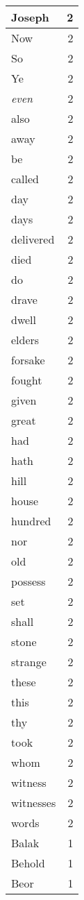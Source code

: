\begin{center}
\begin{longtable}{l|r}
Joseph & 2 \\ \hline
Now & 2 \\ \hline
So & 2 \\ \hline
Ye & 2 \\ \hline
\emph{even} & 2 \\ \hline
also & 2 \\ \hline
away & 2 \\ \hline
be & 2 \\ \hline
called & 2 \\ \hline
day & 2 \\ \hline
days & 2 \\ \hline
delivered & 2 \\ \hline
died & 2 \\ \hline
do & 2 \\ \hline
drave & 2 \\ \hline
dwell & 2 \\ \hline
elders & 2 \\ \hline
forsake & 2 \\ \hline
fought & 2 \\ \hline
given & 2 \\ \hline
great & 2 \\ \hline
had & 2 \\ \hline
hath & 2 \\ \hline
hill & 2 \\ \hline
house & 2 \\ \hline
hundred & 2 \\ \hline
nor & 2 \\ \hline
old & 2 \\ \hline
possess & 2 \\ \hline
set & 2 \\ \hline
shall & 2 \\ \hline
stone & 2 \\ \hline
strange & 2 \\ \hline
these & 2 \\ \hline
this & 2 \\ \hline
thy & 2 \\ \hline
took & 2 \\ \hline
whom & 2 \\ \hline
witness & 2 \\ \hline
witnesses & 2 \\ \hline
words & 2 \\ \hline
Balak & 1 \\ \hline
Behold & 1 \\ \hline
Beor & 1 \\ \hline

\end{longtable}
\end{center}
